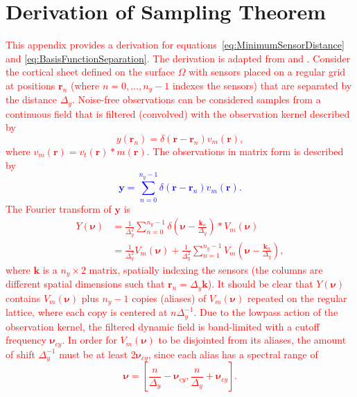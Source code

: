 \documentclass[review,authoryear,3p]{elsarticle}
\newcommand{\dean}[1]{\textcolor{red}{#1}}
\newcommand{\parham}[1]{\textcolor{blue}{#1}}
\begin{document}
\section{Derivation of Sampling Theorem}\label{App:SamplingTheorem}
\dean{This appendix provides a derivation for equations~\ref{eq:MinimumSensorDistance} and \ref{eq:BasisFunctionSeparation}. The derivation is adapted from \citet{Sanner1992} and \citet{Scerri2009}. Consider the cortical sheet defined on the surface $\Omega$ with sensors placed on a regular grid at positions $\mathbf{r}_n$ (where $n=0,...,n_y-1$ indexes the sensors) that are separated by the distance $\Delta_y$. Noise-free observations can be considered samples from a continuous field that is filtered (convolved) with the observation kernel described by
\begin{equation}
	y(\mathbf{r}_n)=\delta(\mathbf r - \mathbf{r}_n ) v_m(\mathbf{r}),
\end{equation} 
where $v_m(\mathbf{r}) = v_t(\mathbf{r})\ast m(\mathbf{r})$. The observations in matrix form is described by
\parham{\begin{equation}
	\mathbf y=\sum_{n=0}^{n_y-1}\delta(\mathbf r - \mathbf{r}_n ) v_m(\mathbf{r}).
\end{equation}}
The Fourier transform of $\mathbf{y}$ is
\begin{align}
 Y(\boldsymbol{\nu}) &= \frac{1}{\Delta_y^2}\sum_{n=0}^{n_y-1} \delta\left(\boldsymbol{\nu}-\frac{\mathbf{k}_n}{\Delta_y}\right) \ast V_m(\boldsymbol \nu) \\
	&= \frac{1}{\Delta_y^2}V_m(\boldsymbol\nu) + \frac{1}{\Delta_y^2} \sum_{n=1}^{n_y-1} V_m\left(\boldsymbol{\nu}-\frac{\mathbf{k}_n}{\Delta_y}\right),
\end{align} 
where $\mathbf{k}$ is a $n_y \times 2$ matrix, spatially indexing the sensors (the columns are different spatial dimensions such that $\mathbf{r}_n = \Delta_y \mathbf{k}$). It should be clear that $Y(\boldsymbol{\nu})$ contains $V_m(\boldsymbol\nu)$ plus $n_y-1$ copies (aliases) of $V_m(\boldsymbol\nu)$ repeated on the regular lattice, where each copy is centered at $n\Delta_y^{-1}$. Due to the lowpass action of the observation kernel, the filtered dynamic field is band-limited with a cutoff frequency $\boldsymbol\nu_{cy}$. In order for $V_m(\boldsymbol\nu)$ to be disjointed from its aliases, the amount of shift $\Delta_y^{-1}$ must be at least $2\boldsymbol\nu_{cy}$, since each alias has a spectral range of
\begin{equation}
	\boldsymbol\nu = \left[\frac{n}{\Delta_y}-\boldsymbol{\nu}_{cy},\frac{n}{\Delta_y}+\boldsymbol{\nu}_{cy}\right].

\end{equation}}
\end{document}
